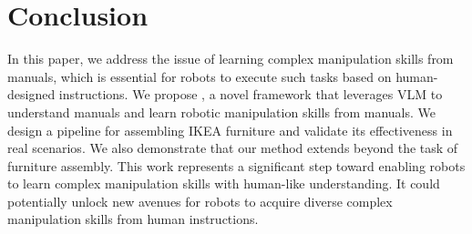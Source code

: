 \section{Conclusion}

In this paper, we address the issue of learning complex manipulation skills from manuals, which is essential for robots to execute such tasks based on human-designed instructions.
We propose \ours, a novel framework that leverages VLM to understand manuals and learn robotic manipulation skills from manuals.
We design a pipeline for assembling IKEA furniture and validate its effectiveness in real scenarios.
We also demonstrate that our method extends beyond the task of furniture assembly.
This work represents a significant step toward enabling robots to learn complex manipulation skills with human-like understanding. It could potentially unlock new avenues for robots to acquire diverse complex manipulation skills from human instructions.